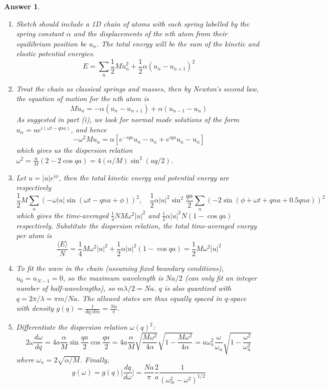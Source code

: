 \documentclass[a4paper]{article}
\newtheorem{ans}{Answer}[subsection]
\theoremstyle{new}
\begin{document}
\begin{ans}\leavevmode
\begin{enumerate}[label=(\roman*)]
\item Sketch should include a 1D chain of atoms with each spring labelled by the spring constant $\alpha$ and the displacements of the $n$th atom from their equilibrium position be $u_n$. The total energy will be the sum of the kinetic and elastic potential energies.
$$E=\sum_n\frac{1}{2}M\dot{u}_n^2+\frac{1}{2}\alpha(u_n-u_{n+1})^2$$
\item Treat the chain as classical springs and masses, then by Newton's second law, the equation of motion for the $n$th atom is
$$M\ddot{u}_n=-\alpha(u_n-u_{n+1})+\alpha(u_{n-1}-u_n)$$
As suggested in part (i), we look for normal mode solutions of the form $u_\alpha=ue^{i(\omega t-qna)}$, and hence
$$-\omega^2Mu_n=\alpha[e^{-iqa}u_n-u_n+e^{iqa}u_n-u_n]$$
which gives us the dispersion relation $\omega^2=\frac{\alpha}{M}(2-2\cos qa)=4(\alpha/M)\sin^2(aq/2)$. 
\item Let $u=|u|e^{i\phi}$, then the total kinetic energy and potential energy are respectively
$$\frac{1}{2}M\sum_n(-\omega|u|\sin(\omega t-qna+\phi))^2,\quad\frac{1}{2}\alpha|u|^2\sin^2\frac{qa}{2}\sum_n(-2\sin(\phi+\omega t+qna+0.5qna))^2$$
which gives the time-averaged $\frac{1}{4}NM\omega^2|u|^2$ and $\frac{1}{2}\alpha|u|^2N(1-\cos qa)$ respectively. Substitute the dispersion relation, the total time-averaged energy per atom is
$$\frac{\langle E\rangle}{N}=\frac{1}{4}M\omega^2|u|^2+\frac{1}{2}\alpha|u|^2(1-\cos qa)=\frac{1}{2}M\omega^2|u|^2$$
\item To fit the wave in the chain (assuming fixed boundary conditions), $u_0=u_{N-1}=0$, so the maximum wavelength is $Na/2$ (can only fit an integer number of half-wavelengths), so $m\lambda/2=Na$. $q$ is also quantized with $q=2\pi/\lambda=\pi m/Na$. The allowed states are thus equally spaced in $q$-space with density $g(q)=\frac{1}{dq/dm}=\frac{Na}{\pi}$.
\item Differentiate the dispersion relation $\omega(q)^2$:
$$2\omega\frac{d\omega}{dq}=4a\frac{\alpha}{M}\sin\frac{qa}{2}\cos\frac{qa}{2}=4a\frac{\alpha}{M}\sqrt{\frac{M\omega^2}{4\alpha}}\sqrt{1-\frac{M\omega^2}{4\alpha}}=a\omega_n^2\frac{\omega}{\omega_n}\sqrt{1-\frac{\omega^2}{\omega_n^2}}$$
where $\omega_n=2\sqrt{\alpha/M}$. Finally,
$$g(\omega)=g(q)\bigg|\frac{dq}{d\omega}\bigg|=\frac{Na}{\pi}\frac{2}{a}\frac{1}{(\omega_m^2-\omega^2)^{1/2}}$$

\end{enumerate}

\end{ans}
\newpage
\end{document}

